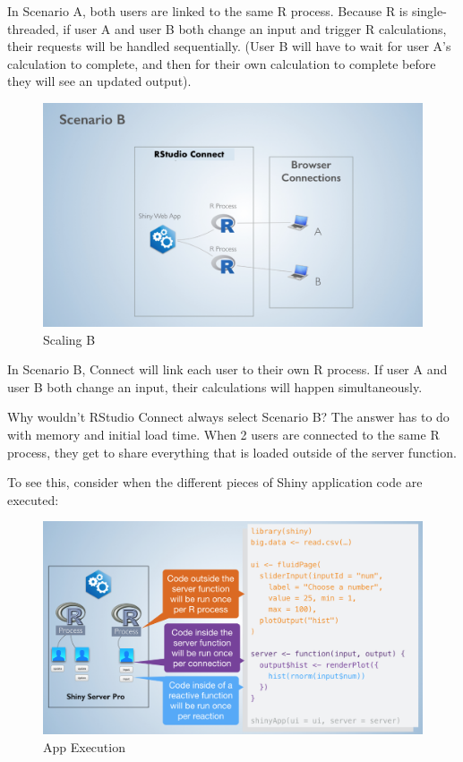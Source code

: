 \documentclass[]{book}
\theoremstyle{definition}
\theoremstyle{definition}
\theoremstyle{definition}
\theoremstyle{remark}
\begin{document}
In Scenario A, both users are linked to the same R process. Because R is
single-threaded, if user A and user B both change an input and trigger R
calculations, their requests will be handled sequentially. (User B will
have to wait for user A's calculation to complete, and then for their
own calculation to complete before they will see an updated output).

\begin{figure}
\centering
\includegraphics{imgs/scaling/scaling-b.png}
\caption{Scaling B}
\end{figure}

In Scenario B, Connect will link each user to their own R process. If
user A and user B both change an input, their calculations will happen
simultaneously.

Why wouldn't RStudio Connect always select Scenario B? The answer has to
do with memory and initial load time. When 2 users are connected to the
same R process, they get to share everything that is loaded outside of
the server function.

To see this, consider when the different pieces of Shiny application
code are executed:

\begin{figure}
\centering
\includegraphics{imgs/scaling/app-execution.png}
\caption{App Execution}
\end{figure}
\end{document}
